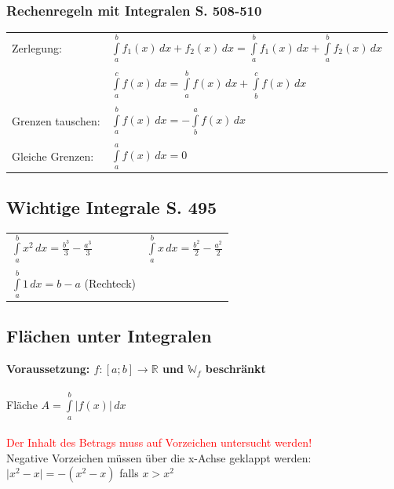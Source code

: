 		
		\subsubsection{Rechenregeln mit Integralen S. 508-510}
		\begin{tabular}{ll}
		Zerlegung: & $\int \limits_{a}^{b} f_1(x) \, dx + f_2(x)\, dx = \int \limits_{a}^{b} f_1(x) \, dx + \int \limits_{a}^{b} f_2(x) \, dx$ \\
		\\		
		& $\int \limits_{a}^{c} f(x)\, dx = \int \limits_{a}^{b} f(x)\, dx + \int \limits_{b}^{c} f(x) \, dx$ \\
		\\
		Grenzen tauschen: & $ \int \limits_{a}^{b} f(x) \, dx = -  \int \limits_{b}^{a} f(x) \, dx $ \\
		\\
		Gleiche Grenzen: &  $\int \limits_{a}^{a} f(x) \, dx = 0$ \\
		\end{tabular}
		
		
		\subsection{Wichtige Integrale S. 495}
		\begin{tabular}{ll}
		$\int \limits_{a}^{b} x^2 \, dx = \frac{b^3}{3} - \frac{a^3}{3}$ & $\int \limits_{a}^{b} x \, dx = \frac{b^2}{2} - \frac{a^2}{2}$ \\
		\\
		$\int \limits_{a}^{b} 1 \, dx = b - a $ (Rechteck)& \\
		\end{tabular}
			
			
		\subsection{Flächen unter Integralen}
		\textbf{Voraussetzung: $f: [a;b] \rightarrow \mathbb{R}$ und $\mathbb{W}_f$ beschränkt}\\
		\\
		Fläche $A = \int \limits_{a}^{b} \vert f(x) \vert \, dx $ \\
		\\
		\textcolor{red}{Der Inhalt des Betrags muss auf Vorzeichen untersucht werden!} \\
		Negative Vorzeichen müssen über die x-Achse geklappt werden: \\
		$\vert x^2 - x \vert = -(x^2 - x)$ falls $x > x^2$ 
		
